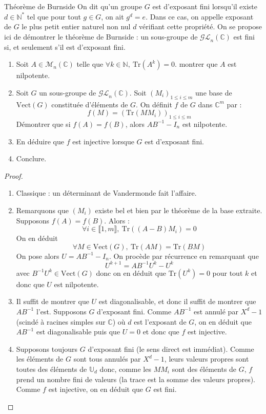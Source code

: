 \documentclass[french,a4paper]{article}
\newcommand{\N}{\mathbb{N}}
\newcommand{\C}{\mathbb{C}}
\newcommand{\U}{\mathbb{U}}
\newcommand{\st}{^*}
\newcommand{\inv}{^{-1}}
\newcommand{\Tr}{\text{Tr}}
\theoremstyle{plain}
\theoremstyle{definition}
\theoremstyle{remark}
\begin{document}
\begin{ex}[Châteaux]{Théorème de Burnside}
	On dit qu'un groupe $G$ est d'exposant fini lorsqu'il existe $d\in\N\st$ tel que pour tout $g\in G$, on ait $g^d=e$. Dans ce cas, on appelle exposant de $G$ le plus petit entier naturel non nul $d$ vérifiant cette propriété. On se propose ici de démontrer le théorème de Burnside : un sous-groupe de $\mathcal{GL}_n(\C)$ est fini si, et seulement s'il est d'exposant fini.
	\begin{enumerate}
		\item Soit $A\in\mathcal{M}_n(\C)$ telle que $\forall k\in\N,\ \Tr(A^k)=0$. montrer que $A$ est nilpotente.
		\item Soit $G$ un sous-groupe de $\mathcal{GL}_n(\C)$. Soit $(M_i)_{1\leqslant i\leqslant m}$ une base de $\text{Vect}(G)$ constituée d'éléments de $G$. On définit $f$ de $G$ dans $\C^m$ par : $$f(M)=\left(\Tr(MM_i)\right)_{1\leqslant i\leqslant m}$$ Démontrer que si $f(A)=f(B)$, alors $AB\inv-I_n$ est nilpotente. 
		\item En déduire que $f$ est injective lorsque $G$ est d'exposant fini.
		\item Conclure.
	\end{enumerate}
\end{ex}
\begin{proof}
	\begin{enumerate}
		\item Classique : un déterminant de Vandermonde fait l'affaire.
		\item Remarquons que $(M_i)$ existe bel et bien par le théorème de la base extraite. Supposons $f(A)=f(B)$. Alors : $$\forall i\in\llbracket1,m\rrbracket,\ \Tr((A-B)M_i)=0$$ On en déduit $$\forall M\in \text{Vect}(G),\ \Tr(AM)=\Tr(BM)$$ On pose alors $U=AB\inv-I_n$. On procède par récurrence en remarquant que $$U^{k+1}=AB\inv U^k-U^k$$ avec $B\inv U^k\in\text{Vect}(G)$ donc on en déduit que $\Tr(U^k)=0$ pour tout $k$ et donc que $U$ est nilpotente.
		\item Il suffit de montrer que $U$ est diagonalisable, et donc il suffit de montrer que $AB\inv$ l'est. Supposons $G$ d'exposant fini. Comme $AB\inv$ est annulé par $X^d-1$ (scindé à racines simples sur $\C$) où $d$ est l'exposant de $G$, on en déduit que $AB\inv$ est diagonalisable puis que $U=0$ et donc que $f$ est injective.
		\item Supposons toujours $G$ d'exposant fini (le sens direct est immédiat). Comme les éléments de $G$ sont tous annulés par $X^d-1$, leurs valeurs propres sont toutes des éléments de $\U_d$ donc, comme les $MM_i$ sont des éléments de $G$, $f$ prend un nombre fini de valeurs (la trace est la somme des valeurs propres). Comme $f$ est injective, on en déduit que $G$ est fini.
	\end{enumerate}
\end{proof}
\end{document}
